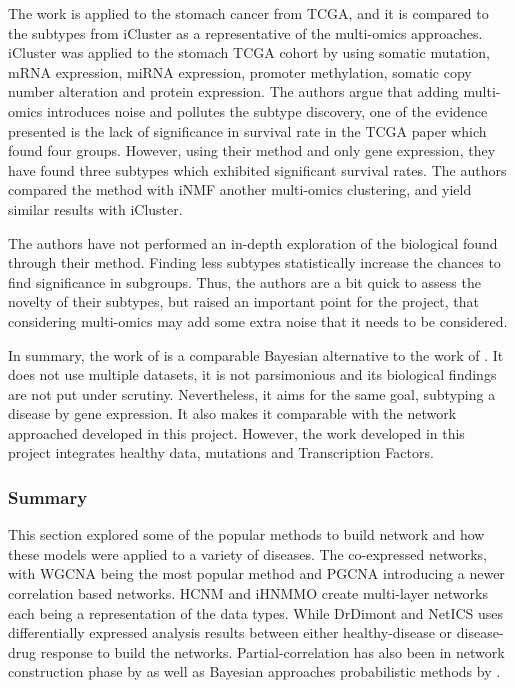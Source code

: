 The work is applied to the stomach cancer from TCGA, and it is compared to the subtypes from iCluster \citet{Shen2009-ew} as a representative of the multi-omics approaches. iCluster was applied to the stomach TCGA cohort by \citet{Cancer_Genome_Atlas_Research_Network2014-xp} using somatic mutation, mRNA expression, miRNA expression, promoter methylation, somatic copy number alteration and protein expression. The authors \citet{Nakazawa2021-yq} argue that adding multi-omics introduces noise and pollutes the subtype discovery, one of the evidence presented is the lack of significance in survival rate in the TCGA paper \citet{Cancer_Genome_Atlas_Research_Network2014-xp} which found four groups. However, using their method and only gene expression, they have found three subtypes which exhibited significant survival rates. The authors compared the method with iNMF \citet{Yang2016-dm} another multi-omics clustering, and yield similar results with iCluster.

The authors have not performed an in-depth exploration of the biological found through their method. Finding less subtypes statistically increase the chances to find significance in subgroups. Thus, the authors are a bit quick to assess the novelty of their subtypes, but raised an important point for the project, that considering multi-omics may add some extra noise that it needs to be considered.

In summary, the work of \citet{Nakazawa2021-yq} is a comparable Bayesian alternative to the work of \citet{Care2019-ij}. It does not use multiple datasets, it is not parsimonious and its biological findings are not put under scrutiny. Nevertheless, it aims for the same goal, subtyping a disease by gene expression. It also makes it comparable with the network approached developed in this project. However, the work developed in this project integrates healthy data, mutations and Transcription Factors.



\subsubsection{Summary}

This section explored some of the popular methods to build network and how these models were applied to a variety of diseases. The co-expressed networks, with WGCNA \cite{Langfelder2008-sn} being the most popular method and PGCNA \cite{Care2019-ij} introducing a newer correlation based networks. HCNM \cite{Vangimalla2021-fc} and iHNMMO \citet{Peng2017-ik} create multi-layer networks each being a representation of the data types. While DrDimont \cite{Hiort2022-lk} and NetICS \citet{Dimitrakopoulos2018-br} uses differentially expressed analysis results between either healthy-disease or disease-drug response to build the networks. Partial-correlation has also been in network construction phase by \citet{De_la_Fuente2004-ts} as well as Bayesian approaches  probabilistic methods by \cite{Nakazawa2021-yq, Tamada2011-ok, Tanaka2020-mw}.

